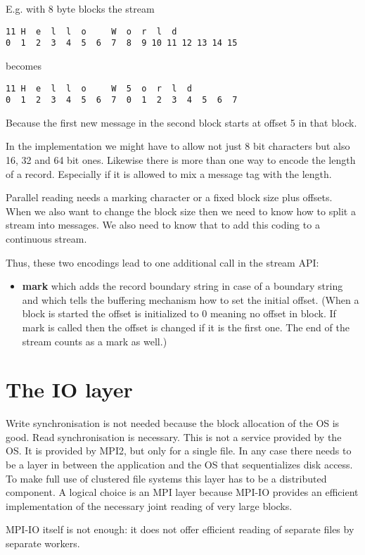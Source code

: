 \documentclass{article}
\begin{document}
E.g. with 8 byte blocks the stream
\begin{verbatim}
11 H  e  l  l  o     W  o  r  l  d
0  1  2  3  4  5  6  7  8  9 10 11 12 13 14 15
\end{verbatim}
becomes
\begin{verbatim}
11 H  e  l  l  o     W  5  o  r  l  d
0  1  2  3  4  5  6  7  0  1  2  3  4  5  6  7
\end{verbatim}
Because the first new message in the second block starts at offset 5 in that block.

In the implementation we might have to allow not just 8 bit characters but also 16, 32 and 64 bit ones.
Likewise there is more than one way to encode the length of a record. Especially if it is allowed to
mix a message tag with the length.

Parallel reading needs a marking character or a fixed block size plus offsets.
When we also want to change the block size then we need to know how to split
a stream into messages. We also need to know that to add this coding to a continuous stream.


Thus, these two encodings lead to one additional call in the stream API:
\begin{itemize}
\item {\bf mark} which adds the record boundary string in case of a boundary string
and which tells the buffering mechanism how to set the initial offset.
(When a block is started the offset is initialized to 0 meaning no offset in block.
If mark is called then the offset is changed if it is the first one.
The end of the stream counts as a mark as well.)
\end{itemize}

\section{The IO layer}

Write synchronisation is not needed because the block allocation of the OS is good.
Read synchronisation is necessary. This is not a service provided by the OS.
It is provided by MPI2, but only for a single file. In any case there needs to be a
layer in between the application and the OS that sequentializes disk access.
To make full use of clustered file systems this layer has to be a distributed component.
A logical choice is an MPI layer because MPI-IO provides an efficient implementation
of the necessary joint reading of very large blocks.

MPI-IO itself is not enough: it does not offer efficient reading of separate files by separate workers.
\end{document}
